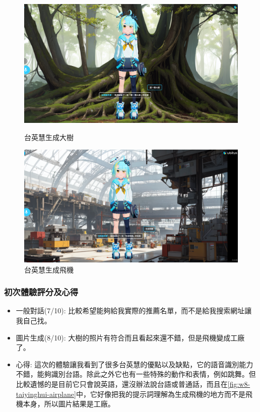 \begin{figure}[htbp!]
	\centering
	\begin{minipage}{0.4\linewidth}
		\includegraphics[width=\linewidth]{images/w8/AIdraw.png}
		\caption{台英慧生成大樹}
        \label{fig:w8-taiyinghui-tree}
	\end{minipage}
    \hspace{2em}
	\begin{minipage}{0.4\linewidth}
		\includegraphics[width=\linewidth]{images/w8/AI飛機.png}
		\caption{台英慧生成飛機}
        \label{fig:w8-taiyinghui-airplane}
	\end{minipage}
\end{figure}



\subsubsection{初次體驗評分及心得}
\begin{itemize}
    \item 一般對話(7/10): 比較希望能夠給我實際的推薦名單，而不是給我搜索網址讓我自己找。
    \item 圖片生成(8/10): 大樹的照片有符合而且看起來還不錯，但是飛機變成工廠了。
    \item 心得: 這次的體驗讓我看到了很多台英慧的優點以及缺點，它的語音識別能力不錯，能夠識別台語。除此之外它也有一些特殊的動作和表情，例如跳舞。但比較遺憾的是目前它只會說英語，還沒辦法說台語或普通話，而且在\autoref{fig:w8-taiyinghui-airplane}中，它好像把我的提示詞理解為生成飛機的地方而不是飛機本身，所以圖片結果是工廠。
\end{itemize}

